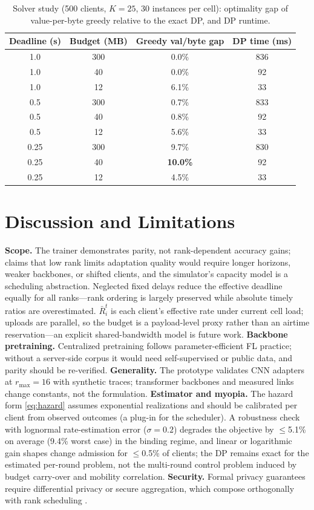 \documentclass[conference]{IEEEtran}
\begin{document}
\begin{table}[t]
\centering
\caption{Solver study (500 clients, $K{=}25$, 30 instances per cell): optimality gap of value-per-byte greedy relative to the exact DP, and DP runtime.}
\label{tab:dp}
\centering\footnotesize
\begin{tabular}{cc c c}
\toprule
Deadline (s) & Budget (MB) & Greedy val/byte gap & DP time (ms)\\
\midrule
1.0  & 300 & 0.0\% & 836\\
1.0  & 40  & 0.0\% & 92\\
1.0  & 12  & 6.1\% & 33\\
0.5  & 300 & 0.7\% & 833\\
0.5  & 40  & 0.8\% & 92\\
0.5  & 12  & 5.6\% & 33\\
0.25 & 300 & 9.7\% & 830\\
0.25 & 40  & \textbf{10.0\%} & 92\\
0.25 & 12  & 4.5\% & 33\\
\bottomrule
\end{tabular}
\end{table}

\section{Discussion and Limitations}
\label{sec:discussion}
\textbf{Scope.} The trainer demonstrates parity, not rank-dependent accuracy gains; claims that low rank limits adaptation quality would require longer horizons, weaker backbones, or shifted clients, and the simulator's capacity model is a scheduling abstraction. Neglected fixed delays reduce the effective deadline equally for all ranks---rank ordering is largely preserved while absolute timely ratios are overestimated. $\bar R_i^t$ is each client's effective rate under current cell load; uploads are parallel, so the budget is a payload-level proxy rather than an airtime reservation---an explicit shared-bandwidth model is future work. \textbf{Backbone pretraining.} Centralized pretraining follows parameter-efficient FL practice; without a server-side corpus it would need self-supervised or public data, and parity should be re-verified. \textbf{Generality.} The prototype validates CNN adapters at $r_{\max}{=}16$ with synthetic traces; transformer backbones and measured links change constants, not the formulation. \textbf{Estimator and myopia.} The hazard form \eqref{eq:hazard} assumes exponential realizations and should be calibrated per client from observed outcomes (a plug-in for the scheduler). A robustness check with lognormal rate-estimation error ($\sigma{=}0.2$) degrades the objective by $\le$5.1\% on average (9.4\% worst case) in the binding regime, and linear or logarithmic gain shapes change admission for $\le$0.5\% of clients; the DP remains exact for the estimated per-round problem, not the multi-round control problem induced by budget carry-over and mobility correlation. \textbf{Security.} Formal privacy guarantees require differential privacy or secure aggregation, which compose orthogonally with rank scheduling \cite{bonawitz2017secureagg,wei2023pfl_dp}.
\end{document}
